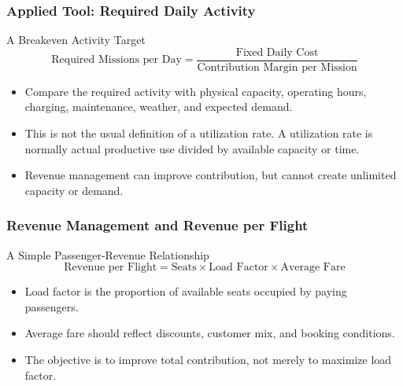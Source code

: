 \documentclass{beamer}
\begin{document}
\begin{frame}[t]
  \frametitle{Applied Tool: Required Daily Activity}
  \begin{block}{A Breakeven Activity Target}
  \[
    \text{Required Missions per Day}
    =
    \frac{\text{Fixed Daily Cost}}{\text{Contribution Margin per Mission}}
  \]
  \end{block}
  \begin{itemize}
    \item Compare the required activity with physical capacity, operating hours, charging, maintenance, weather, and expected demand.
    \item This is not the usual definition of a utilization rate. A utilization rate is normally actual productive use divided by available capacity or time.
    \item Revenue management can improve contribution, but cannot create unlimited capacity or demand.
  \end{itemize}
\end{frame}

\begin{frame}[t]
  \frametitle{Revenue Management and Revenue per Flight}
  \begin{block}{A Simple Passenger-Revenue Relationship}
  \[
    \text{Revenue per Flight}
    =
    \text{Seats}\times\text{Load Factor}\times\text{Average Fare}
  \]
  \end{block}
  \begin{itemize}
    \item Load factor is the proportion of available seats occupied by paying passengers.
    \item Average fare should reflect discounts, customer mix, and booking conditions.
    \item The objective is to improve total contribution, not merely to maximize load factor.
  \end{itemize}
\end{frame}
\end{document}
